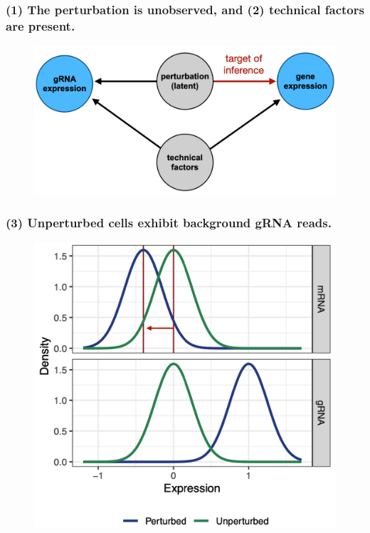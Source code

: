 \documentclass{beamer}
\begin{document}
\begin{frame}
\frametitle{(1) The perturbation is unobserved, and (2) technical factors are present.}
\begin{figure}
	\centering
	\includegraphics[width=1\linewidth]{../figures/fig1/dag}
	\label{dag}
\end{figure}
\end{frame}

\begin{frame}
\frametitle{(3) Unperturbed cells exhibit background gRNA reads.}
\begin{figure}
	\centering
	\includegraphics[width=0.75\linewidth]{../figures/fig1/density_plot_annotated.png}
\end{figure}
\end{frame}
\end{document}
